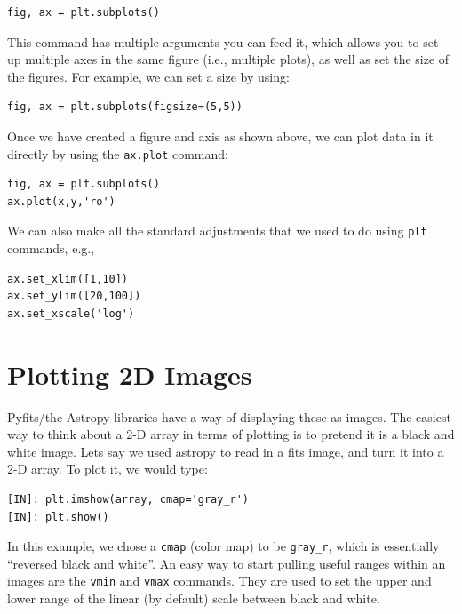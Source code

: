 \begin{lstlisting}
fig, ax = plt.subplots()
\end{lstlisting} %

This command has multiple arguments you can feed it, which allows you to set up multiple axes in the same figure (i.e., multiple plots), as well as set the size of the figures. %
For example, we can set a size by using: %

\begin{lstlisting}
fig, ax = plt.subplots(figsize=(5,5))
\end{lstlisting} %

Once we have created a figure and axis as shown above, we can plot data in it directly by using the \texttt{ax.plot} command: %

\begin{lstlisting}
fig, ax = plt.subplots()
ax.plot(x,y,'ro')
\end{lstlisting} %

We can also make all the standard adjustments that we used to do using \texttt{plt} commands, e.g., %

\begin{lstlisting}
ax.set_xlim([1,10])
ax.set_ylim([20,100])
ax.set_xscale('log')
\end{lstlisting} %

\section{Plotting 2D Images} %
Pyfits/the Astropy libraries have a way of displaying these as images. %
The easiest way to think about a 2-D array in terms of plotting is to pretend it is a black and white image. %
Lets say we used astropy to read in a fits image, and turn it into a 2-D array. %
To plot it, we would type: %

\begin{lstlisting}
[IN]: plt.imshow(array, cmap='gray_r')
[IN]: plt.show()
\end{lstlisting} %

In this example, we chose a \texttt{cmap} (color map) to be \texttt{gray\_r}, which is essentially ``reversed black and white''. %
An easy way to start pulling useful ranges within an images are the \texttt{vmin} and \texttt{vmax} commands. %
They are used to set the upper and lower range of the linear (by default) scale between black and white. %

